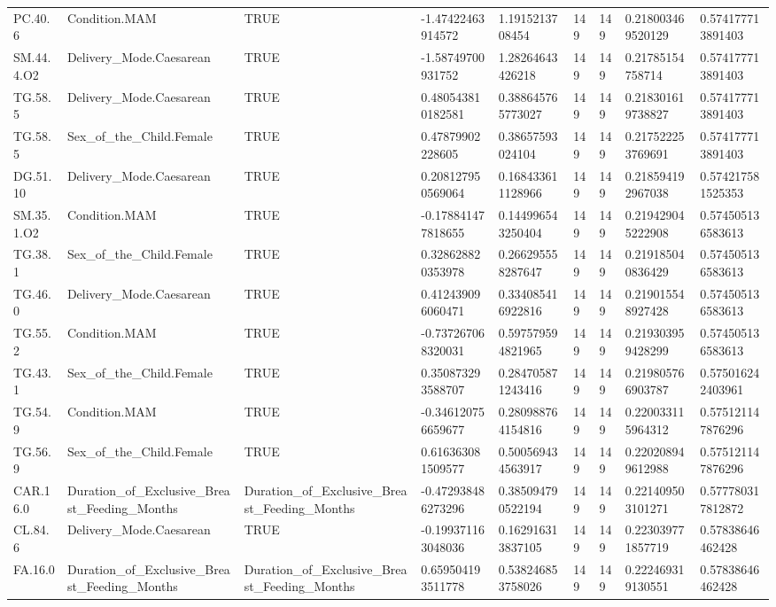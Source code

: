 \begin{longtable}{lllllllll}
PC.40.6 & Condition.MAM & TRUE & -1.47422463914572 & 1.1915213708454 & 149 & 149 & 0.218003469520129 & 0.574177713891403 \\
SM.44.4.O2 & Delivery\_Mode.Caesarean & TRUE & -1.58749700931752 & 1.28264643426218 & 149 & 149 & 0.21785154758714 & 0.574177713891403 \\
TG.58.5 & Delivery\_Mode.Caesarean & TRUE & 0.480543810182581 & 0.388645765773027 & 149 & 149 & 0.218301619738827 & 0.574177713891403 \\
TG.58.5 & Sex\_of\_the\_Child.Female & TRUE & 0.47879902228605 & 0.38657593024104 & 149 & 149 & 0.217522253769691 & 0.574177713891403 \\
DG.51.10 & Delivery\_Mode.Caesarean & TRUE & 0.208127950569064 & 0.168433611128966 & 149 & 149 & 0.218594192967038 & 0.574217581525353 \\
SM.35.1.O2 & Condition.MAM & TRUE & -0.178841477818655 & 0.144996543250404 & 149 & 149 & 0.219429045222908 & 0.574505136583613 \\
TG.38.1 & Sex\_of\_the\_Child.Female & TRUE & 0.328628820353978 & 0.266295558287647 & 149 & 149 & 0.219185040836429 & 0.574505136583613 \\
TG.46.0 & Delivery\_Mode.Caesarean & TRUE & 0.412439096060471 & 0.334085416922816 & 149 & 149 & 0.219015548927428 & 0.574505136583613 \\
TG.55.2 & Condition.MAM & TRUE & -0.737267068320031 & 0.597579594821965 & 149 & 149 & 0.219303959428299 & 0.574505136583613 \\
TG.43.1 & Sex\_of\_the\_Child.Female & TRUE & 0.350873293588707 & 0.284705871243416 & 149 & 149 & 0.219805766903787 & 0.575016242403961 \\
TG.54.9 & Condition.MAM & TRUE & -0.346120756659677 & 0.280988764154816 & 149 & 149 & 0.220033115964312 & 0.575121147876296 \\
TG.56.9 & Sex\_of\_the\_Child.Female & TRUE & 0.616363081509577 & 0.500569434563917 & 149 & 149 & 0.220208949612988 & 0.575121147876296 \\
CAR.16.0 & Duration\_of\_Exclusive\_Breast\_Feeding\_Months & Duration\_of\_Exclusive\_Breast\_Feeding\_Months & -0.472938486273296 & 0.385094790522194 & 149 & 149 & 0.221409503101271 & 0.577780317812872 \\
CL.84.6 & Delivery\_Mode.Caesarean & TRUE & -0.199371163048036 & 0.162916313837105 & 149 & 149 & 0.223039771857719 & 0.57838646462428 \\
FA.16.0 & Duration\_of\_Exclusive\_Breast\_Feeding\_Months & Duration\_of\_Exclusive\_Breast\_Feeding\_Months & 0.659504193511778 & 0.538246853758026 & 149 & 149 & 0.222469319130551 & 0.57838646462428 \\

\end{longtable}
